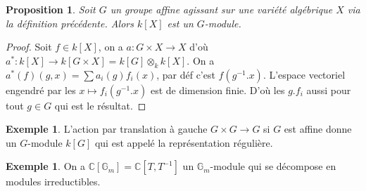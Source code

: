 \documentclass[a4paper,12pt]{book}
\newcommand{\C}{\mathbb{C}}
\newcommand{\Gr}{\mathbb{G}}
\theoremstyle{plain}
\newtheorem{prop}[subsection]{Proposition}
\theoremstyle{definition}
\newtheorem{ex}[subsection]{Exemple}
\theoremstyle{remark}
\begin{document}
\begin{prop}
  Soit $G$ un groupe affine agissant sur une variété algébrique 
  $X$ via la définition précédente. Alors $k[X]$ est un $G$-module.
\end{prop}
\begin{proof}
  Soit $f\in k[X]$, on a $a\colon G\times X\to X$ d'où 
  $a^*\colon k[X]\to k[G\times X]=k[G]\otimes_k k[X]$. On a
  $a^*(f)(g,x)=\sum a_i(g)f_i(x)$, par déf c'est
  $f(g^{-1}.x)$. L'espace vectoriel engendré par les $x\mapsto
  f_i(g^{-1}.x)$ est de dimension finie. D'où les $g.f_i$ aussi
  pour tout $g\in G$ qui est le résultat.
\end{proof}
\begin{ex}
  L'action par translation à gauche $G\times G\to G$ si $G$
  est affine donne un $G$-module $k[G]$ qui est appelé la
  représentation régulière.
\end{ex}
\begin{ex}
  On a $\C[\Gr_m]=\C[T,T^{-1}]$ un $\Gr_m$-module qui se décompose
  en modules irreductibles.
\end{ex}

\printbibliography
\end{document}
